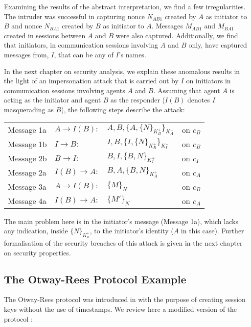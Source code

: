 \documentclass[10pt,a4paper,final,oneside,fleqn]{book}
\begin{document}
Examining the results of the abstract interpretation, we find a few irregularities. The intruder was successful in capturing nonce $N_{AB1}$ created by $A$ as initiator to $B$ and nonce $N_{BA1}$ created by $B$ as initiator to $A$. Messages $M_{AB1}$ and $M_{BA1}$ created in sessions between $A$ and $B$ were also captured.  Additionally, we find that initiators, in communication sessions involving $A$ and $B$ only, have captured messages from, $I$, that can be any of $I$'s names.

In the next chapter on security analysis, we explain these anomalous results in the light of an impersonation attack that is carried out by $I$ on initiators in communication sessions involving agents $A$ and $B$.  Assuming that agent $A$ is acting as the initiator and agent $B$ as the responder ($I(B)$ denotes $I$ masquerading as $B$), the following steps describe the attack:\vspace{5mm}

\begin{tabular}{llll}
Message 1a&\hspace{5mm}$A\to I(B):$&$A,B,\{A,\{N\}_{K^+_{B}}\}_{K^-_{A}}$&on $c_{B}$\\
Message 1b&\hspace{5mm}$I\to B:$&$I,B,\{I,\{N\}_{K^+_{B}}\}_{K^-_{I}}$&on $c_{B}$\\
Message 2b&\hspace{5mm}$B\to I:$&$B,I,\{B,N\}_ {K^+_{I}}$&on $c_{I}$\\
Message 2a&\hspace{5mm}$I(B)\to A:$&$B,A,\{B,N\}_ {K^+_{A}}$&on $c_{A}$\\
Message 3a&\hspace{5mm}$A\to I(B):$&$\{M\}_{N}$&on $c_{B}$\\
Message 4a&\hspace{5mm}$I(B)\to A:$&$\{M'\}_{N}$&on $c_{A}$
\end{tabular}\vspace{5mm}

\noindent
The main problem here is in the initiator's message (Message 1a), which lacks any indication, inside $\{N\}_{K^+_{B}}$, to the initiator's identity ($A$ in this case).  Further formalisation of the security breaches of this attack is given in the next chapter on security properties.
\subsection{The Otway-Rees Protocol Example\label{sect:anotwayrees}}
The Otway-Rees protocol was introduced in \cite{otway1} with the purpose of creating session keys without the use of timestamps.  We review here a modified version of the protocol \cite{burrows1}:\vspace{4mm}
\end{document}
